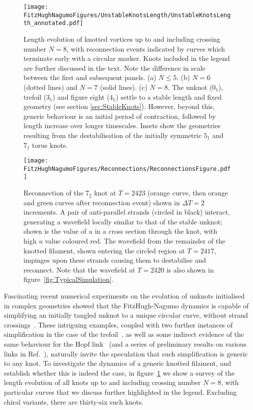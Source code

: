 \begin{figure}[htbp]
\centering
    \texttt{[image: \\FitzHughNagumoFigures/UnstableKnotsLength/UnstableKnotsLength\_annotated.pdf]}
    \caption{ Length evolution of knotted vortices up to and including crossing number $N=8$, with reconnection events indicated by curves which terminate early with a circular marker. Knots included in the legend are further discussed in the text. Note the difference in scale between the first and subsequent panels. (a) $N\leq5$. (b) $N=6$ (dotted lines) and $N=7$ (solid lines). (c) $N=8$. The unknot ($0_1$), trefoil ($3_1$) and figure eight ($4_1$) settle to a stable length and fixed geometry (see section \ref{sec:StableKnots}). However, beyond this, generic behaviour is an initial period of contraction, followed by length increase over longer timescales. Insets show the geometries resulting from the destabilisation of the initially symmetric $5_1$ and $7_1$ torus knots.} 
\label{fig:UnstableKnotsLength}
\end{figure}

\begin{figure}[htbp]
\centering
    \texttt{[image: \\FitzHughNagumoFigures/Reconnections/ReconnectionsFigure.pdf]}
    \caption{Reconnection of the $7_2$ knot at $T=2423$ (orange curve, then orange and green curves after reconnection event) shown in $\Delta T = 2$ increments. A pair of anti-parallel strands (circled in black) interact, generating a wavefield locally similar to that of the stable unknot; shown is the value of $u$ in a cross section through the knot, with high $u$ value coloured red. The wavefield from the remainder of the knotted filament, shown entering the circled region at $T=2417$, impinges upon these strands causing them to destabilise and reconnect. Note that the wavefield at $T=2420$ is also shown in figure~\ref{fig:TypicalSimulation}.}
\label{fig:Reconnections}
\end{figure}

Fascinating recent numerical experiments on the evolution of unknots initialised in complex geometries showed that the FitzHugh-Nagumo dynamics is capable of simplifying an initially tangled unknot to a unique circular curve, without strand crossings~\citep{Maucher2016}. These intriguing examples, coupled with two further instances of simplification in the case of the trefoil~\citep{Sutcliffe2003}, as well as some indirect evidence of the same behaviour for the Hopf link~\citep{Maucher2019} (and a series of preliminary results on various links in Ref.~\citep{Henze1993}), naturally invite the speculation that such simplification is generic to any knot. To investigate the dynamics of a generic knotted filament, and establish whether this is indeed the case, in figure~\ref{fig:UnstableKnotsLength} we show a survey of the length evolution of all knots up to and including crossing number $N=8$, with particular curves that we discuss further highlighted in the legend. Excluding chiral variants, there are thirty-six such knots. 

